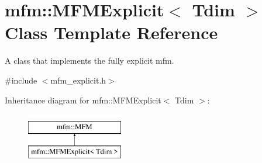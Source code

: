 \hypertarget{classmfm_1_1_m_f_m_explicit}{}\section{mfm\+:\+:M\+F\+M\+Explicit$<$ Tdim $>$ Class Template Reference}
\label{classmfm_1_1_m_f_m_explicit}


A class that implements the fully explicit mfm.  




{\ttfamily \#include $<$mfm\+\_\+explicit.\+h$>$}

Inheritance diagram for mfm\+:\+:M\+F\+M\+Explicit$<$ Tdim $>$\+:\begin{figure}[H]
\begin{center}
\leavevmode
\includegraphics[height=2.000000cm]{classmfm_1_1_m_f_m_explicit}
\end{center}
\end{figure}
